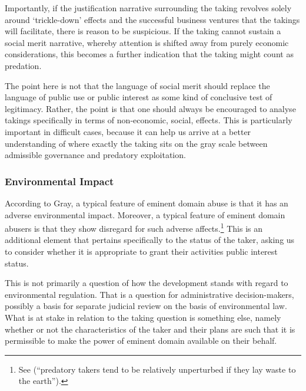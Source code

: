 Importantly, if the justification narrative surrounding the taking revolves solely around `trickle-down' effects and the successful business ventures that the takings will facilitate, there is reason to be suspicious. If the taking cannot sustain a social merit narrative, whereby attention is shifted away from purely economic considerations, this becomes a further indication that the taking might count as predation. 

The point here is not that the language of social merit should replace the language of public use or public interest as some kind of conclusive test of legitimacy. Rather, the point is that one should always be encouraged to analyse takings specifically in terms of non-economic, social, effects. This is particularly important in difficult cases, because it can help us arrive at a better understanding of where exactly the taking sits on the gray scale between admissible governance and predatory exploitation. 


\subsubsection*{Environmental Impact}

According to Gray, a typical feature of eminent domain abuse is that it has an adverse environmental impact. Moreover, a typical feature of eminent domain abusers is that they show disregard for such adverse affects.\footnote{See \cite[34]{gray11} (``predatory takers tend to be relatively unperturbed if they lay waste to the earth'').} This is an additional element that pertains specifically to the status of the taker, asking us to consider whether it is appropriate to grant their activities public interest status.

This is not primarily a question of how the development stands with regard to environmental regulation. That is a question for administrative decision-makers, possibly a basis for separate judicial review on the basis of environmental law. What is at stake in relation to the taking question is something else, namely whether or not the characteristics of the taker and their plans are such that it is permissible to make the power of eminent domain available on their behalf.


